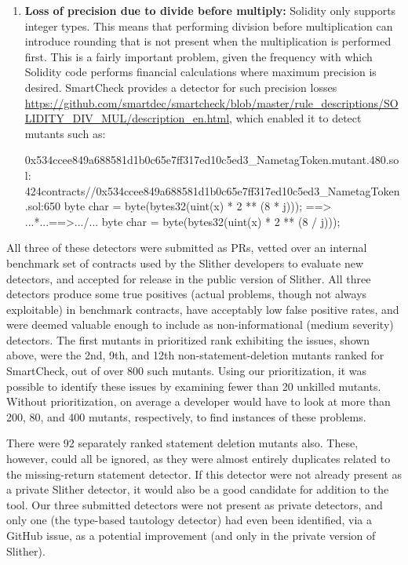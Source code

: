 \begin{enumerate}
\item {\bf Loss of precision due to divide before multiply:}  Solidity only supports integer types.  This means that performing division before multiplication can introduce rounding that is not present when the multiplication is performed first.  This is a fairly important problem, given the frequency with which Solidity code performs financial calculations where maximum precision is desired.  SmartCheck provides a detector for such precision losses \url{https://github.com/smartdec/smartcheck/blob/master/rule_descriptions/SOLIDITY_DIV_MUL/description_en.html}, which enabled it to detect mutants such as:

\begin{code}
0x534ccee849a688581d1b0c65e7ff317ed10c5ed3\_NametagToken.mutant.480.sol: 424contracts//0x534ccee849a688581d1b0c65e7ff317ed10c5ed3\_NametagToken.sol:650
        byte char = byte(bytes32(uint(x) * 2 ** (8 * j)));
 ==>  ...*...==>.../...
        byte char = byte(bytes32(uint(x) * 2 ** (8 / j)));
\end{code}

\end{enumerate}      

All three of these detectors were submitted as PRs, vetted over an internal benchmark set of contracts used by the Slither developers to evaluate new detectors, and accepted for release in the public version of Slither.  All three detectors produce some true positives (actual problems, though not always exploitable) in benchmark contracts, have acceptably low false positive rates, and were deemed valuable enough to include as non-informational (medium severity) detectors.  The first mutants in prioritized rank exhibiting the issues, shown above, were the 2nd, 9th, and 12th non-statement-deletion mutants ranked for SmartCheck, out of over 800 such mutants.  Using our prioritization, it was possible to identify these issues by examining fewer than 20 unkilled mutants.  Without prioritization, on average a developer would have to look at more than 200, 80, and 400 mutants, respectively, to find instances of these problems.  

There were 92 separately ranked statement deletion mutants also.  These, however, could all be ignored, as they were almost entirely duplicates related to the missing-return statement detector.  If this detector were not already present as a private Slither detector, it would also be a good candidate for addition to the tool.  Our three submitted detectors were not present as private detectors, and only one (the type-based tautology detector) had even been identified, via a GitHub issue, as a potential improvement (and only in the private version of Slither).  

